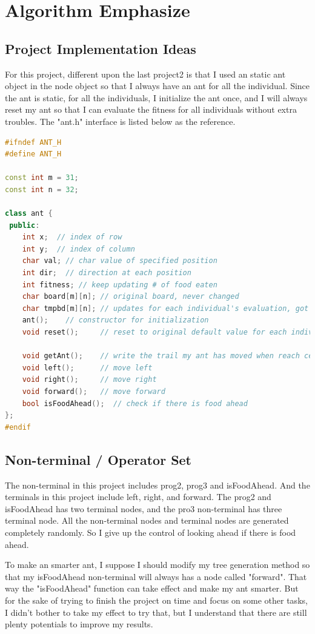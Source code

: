 \documentclass[10pt,b5paper]{article}
\begin{document}
\section{Algorithm Emphasize}
\label{sec-1}
\subsection{Project Implementation Ideas}
\label{sec-1-1}
For this project, different upon the last project2 is that I used an static ant object in the node object so that I always have an ant for all the individual. Since the ant is static, for all the individuals, I initialize the ant once, and I will always reset my ant so that I can evaluate the fitness for all individuals without extra troubles. 
The "ant.h" interface is listed below as the reference. 
\begin{lstlisting}[language=c++]
#ifndef ANT_H
#define ANT_H

const int m = 31;
const int n = 32;

class ant {
 public:
    int x;  // index of row
    int y;  // index of column
    char val; // char value of specified position
    int dir;  // direction at each position
    int fitness; // keep updating # of food eaten
    char board[m][n]; // original board, never changed
    char tmpbd[m][n]; // updates for each individual's evaluation, got reset for every individual
    ant();    // constructor for initialization
    void reset();     // reset to original default value for each individual

    void getAnt();    // write the trail my ant has moved when reach certain fitness
    void left();      // move left
    void right();     // move right
    void forward();   // move forward
    bool isFoodAhead();  // check if there is food ahead
};
#endif
\end{lstlisting}
\subsection{Non-terminal / Operator Set}
\label{sec-1-2}
The non-terminal in this project includes prog2, prog3 and isFoodAhead.
And the terminals in this project include left, right, and forward.
The prog2 and isFoodAhead has two terminal nodes, and the pro3 non-terminal has three terminal node. All the non-terminal nodes and terminal nodes are generated completely randomly. So I give up the control of looking ahead if there is food ahead. 

To make an smarter ant, I suppose I should modify my tree generation method so that my isFoodAhead non-terminal will always has a node called "forward". That way the "isFoodAhead" function can take effect and make my ant smarter. But for the sake of trying to finish the project on time and focus on some other tasks, I didn't bother to take my effect to try that, but I understand that there are still plenty potentials to improve my results. 
\end{document}
